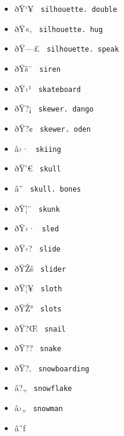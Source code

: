 \begin{itemize}
\item
  \label{symbol-silhouette.double}{{ ðŸ`¥ }
  \texttt{\ silhouette.\ double\ }}
\item
  \label{symbol-silhouette.hug}{{ ðŸ«‚ }
  \texttt{\ silhouette.\ hug\ }}
\item
  \label{symbol-silhouette.speak}{{ ðŸ---£ }
  \texttt{\ silhouette.\ speak\ }}
\item
  \label{symbol-siren}{{ ðŸš¨ } \texttt{\ siren\ }}
\item
  \label{symbol-skateboard}{{ ðŸ›¹ }
  \texttt{\ skateboard\ }}
\item
  \label{symbol-skewer.dango}{{ ðŸ?¡ }
  \texttt{\ skewer.\ dango\ }}
\item
  \label{symbol-skewer.oden}{{ ðŸ?¢ }
  \texttt{\ skewer.\ oden\ }}
\item
  \label{symbol-skiing}{{ â›· } \texttt{\ skiing\ }}
\item
  \label{symbol-skull}{{ ðŸ'€ } \texttt{\ skull\ }}
\item
  \label{symbol-skull.bones}{{ â˜ }
  \texttt{\ skull.\ bones\ }}
\item
  \label{symbol-skunk}{{ ðŸ¦¨ } \texttt{\ skunk\ }}
\item
  \label{symbol-sled}{{ ðŸ›· } \texttt{\ sled\ }}
\item
  \label{symbol-slide}{{ ðŸ›? } \texttt{\ slide\ }}
\item
  \label{symbol-slider}{{ ðŸŽš } \texttt{\ slider\ }}
\item
  \label{symbol-sloth}{{ ðŸ¦¥ } \texttt{\ sloth\ }}
\item
  \label{symbol-slots}{{ ðŸŽ° } \texttt{\ slots\ }}
\item
  \label{symbol-snail}{{ ðŸ?Œ } \texttt{\ snail\ }}
\item
  \label{symbol-snake}{{ ðŸ?? } \texttt{\ snake\ }}
\item
  \label{symbol-snowboarding}{{ ðŸ?‚ }
  \texttt{\ snowboarding\ }}
\item
  \label{symbol-snowflake}{{ â?„ }
  \texttt{\ snowflake\ }}
\item
  \label{symbol-snowman}{{ â›„ } \texttt{\ snowman\ }}
\item
  \label{symbol-snowman.snow}{{ â˜ƒ }
}
\end{itemize}
